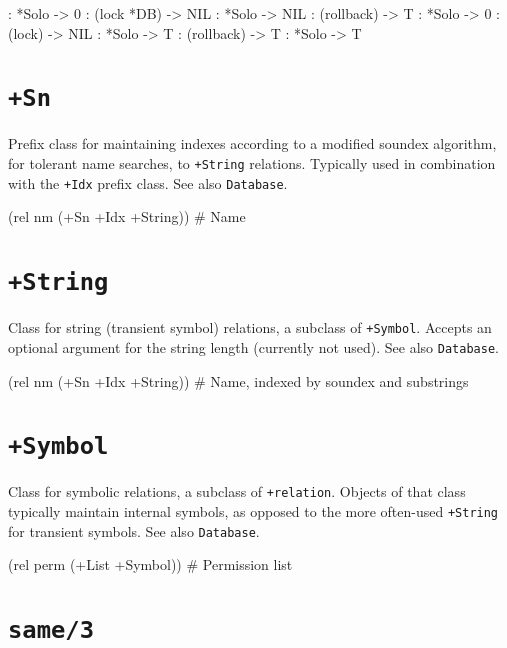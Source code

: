 \begin{wideverbatim}
: *Solo
-> 0
: (lock *DB)
-> NIL
: *Solo
-> NIL
: (rollback)
-> T
: *Solo
-> 0
: (lock)
-> NIL
: *Solo
-> T
: (rollback)
-> T
: *Solo
-> T
\end{wideverbatim}

 
\section*{\texttt{+Sn}}
\label{sec:func-ref-S-+Sn}


Prefix class for maintaining indexes according to a modified soundex
algorithm, for tolerant name searches, to \texttt{+String} relations. Typically
used in combination with the \texttt{+Idx} prefix class. See also \texttt{Database}.


\begin{wideverbatim}
(rel nm (+Sn +Idx +String))  # Name
\end{wideverbatim}

 
\section*{\texttt{+String}}
\label{sec:func-ref-S-+String}


Class for string (transient symbol) relations, a subclass of \texttt{+Symbol}.
Accepts an optional argument for the string length (currently not used).
See also \texttt{Database}.


\begin{wideverbatim}
(rel nm (+Sn +Idx +String))  # Name, indexed by soundex and substrings
\end{wideverbatim}

 
\section*{\texttt{+Symbol}}
\label{sec:func-ref-S-+Symbol}


Class for symbolic relations, a subclass of \texttt{+relation}. Objects of that
class typically maintain internal symbols, as opposed to the more
often-used \texttt{+String} for transient symbols. See also \texttt{Database}.


\begin{wideverbatim}
(rel perm (+List +Symbol))  # Permission list
\end{wideverbatim}

 
\section*{\texttt{same/3}}
\label{sec:func-ref-S-same/3}


